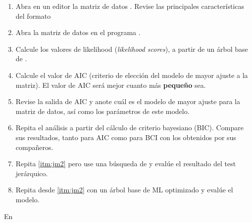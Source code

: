 \begin{enumerate}
	\item  Abra en un editor la matriz de datos . Revise las principales caracter\'isticas del formato 

	\item  Abra la matriz de datos en el programa .
	
	\item\label{itm:jm2} Calcule los valores de likelihood ({\textit{likelihood scores}}), a partir de un \'arbol base de . 
	
	\item Calcule el valor de AIC (criterio de elecci\'on del modelo de mayor ajuste a la matriz). El valor de AIC ser\'a mejor cuanto m\'as \textbf{peque\~no} sea.
	
	\item Revise la salida de AIC y anote cu\'al es el modelo de mayor ajuste para la matriz de datos, as\'i como los par\'ametros de este modelo.
	
	\item Repita el an\'alisis a partir del c\'alculo de criterio bayesiano (BIC). Compare sus resultados, tanto para AIC como para BCI con los obtenidos por sus compa\~neros.

	\item Repita \ref{itm:jm2}  pero use una b\'usqueda de  y eval\'ue el resultado del test jer\'arquico. 

	\item Repita desde \ref{itm:jm2} con un \'arbol base de ML optimizado y eval\'ue el modelo.

\end{enumerate}



En 


